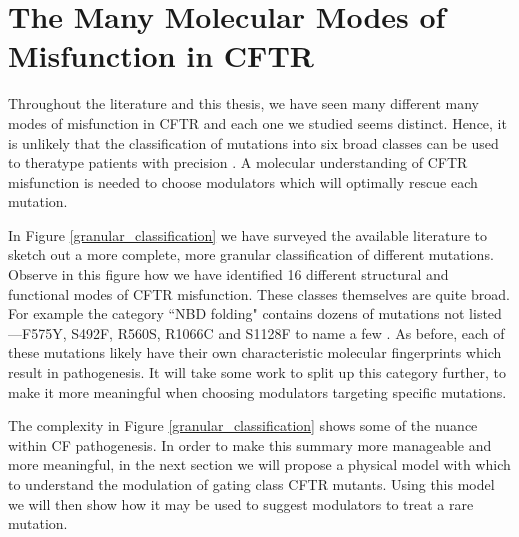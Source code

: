 \section{The Many Molecular Modes of Misfunction in CFTR}

Throughout the literature and this thesis, we have seen many different many modes of misfunction in CFTR and each one we studied seems distinct. Hence, it is unlikely that the classification of mutations into six broad classes can be used to theratype patients with precision \cite{veit2016}. A molecular understanding of CFTR misfunction is needed to choose modulators which will optimally rescue each mutation.

In Figure \ref{granular_classification} we have surveyed the available literature to sketch out a more complete, more granular classification of different mutations. Observe in this figure how we have identified 16 different structural and functional modes of CFTR misfunction. These classes themselves are quite broad. For example the category ``NBD folding" contains dozens of mutations not listed---F575Y, S492F, R560S, R1066C and S1128F to name a few \cite{awatade2019, lopes-pacheco2016, casals1997, cotten1996, penmatsa2009}. As before, each of these mutations likely have their own characteristic molecular fingerprints which result in pathogenesis. It will take some work to split up this category further, to make it more meaningful when choosing modulators targeting specific mutations.

The complexity in Figure \ref{granular_classification} shows some of the nuance within CF pathogenesis. In order to make this summary more manageable and more meaningful, in the next section we will propose a physical model with which to understand the modulation of gating class CFTR mutants. Using this model we will then show how it may be used to suggest modulators to treat a rare mutation.

